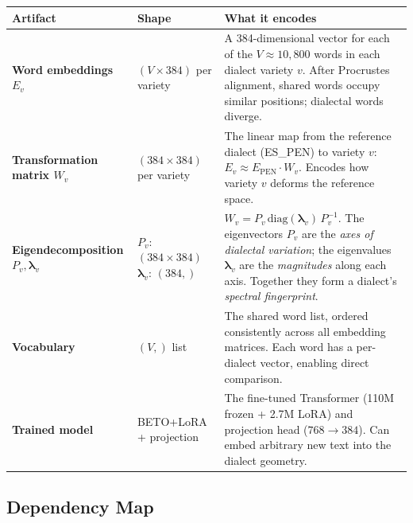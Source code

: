 \documentclass[11pt,a4paper]{article}
\begin{document}
\begin{center}
\renewcommand{\arraystretch}{1.4}
\begin{tabular}{>{\bfseries}p{2.8cm} p{2.2cm} p{7.5cm}}
\toprule
\textbf{Artifact} & \textbf{Shape} & \textbf{What it encodes} \\
\midrule
Word embeddings $E_v$ &
  $(V \times 384)$ \newline per variety &
  A 384-dimensional vector for each of the $V \approx 10{,}800$ words in
  each dialect variety $v$. After Procrustes alignment, shared words
  occupy similar positions; dialectal words diverge. \\

Transformation matrix $W_{v}$ &
  $(384 \times 384)$ \newline per variety &
  The linear map from the reference dialect (ES\_PEN) to variety $v$:
  $E_v \approx E_{\text{PEN}} \cdot W_v$. Encodes how variety $v$
  deforms the reference space. \\

Eigendecomposition $P_v, \boldsymbol{\lambda}_v$ &
  $P_v$: $(384 \times 384)$ \newline $\boldsymbol{\lambda}_v$: $(384,)$ &
  $W_v = P_v \,\text{diag}(\boldsymbol{\lambda}_v)\, P_v^{-1}$.
  The eigenvectors $P_v$ are the \emph{axes of dialectal variation};
  the eigenvalues $\boldsymbol{\lambda}_v$ are the \emph{magnitudes}
  along each axis. Together they form a dialect's
  \emph{spectral fingerprint}. \\

Vocabulary &
  $(V,)$ list &
  The shared word list, ordered consistently across all embedding
  matrices. Each word has a per-dialect vector, enabling direct
  comparison. \\

Trained model &
  BETO+LoRA \newline + projection &
  The fine-tuned Transformer (110M frozen + 2.7M LoRA) and
  projection head ($768 \to 384$). Can embed arbitrary new text
  into the dialect geometry. \\
\bottomrule
\end{tabular}
\end{center}

\subsection{Dependency Map}
\end{document}
